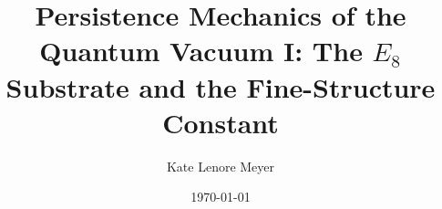 \documentclass[aps,prd,twocolumn,showpacs,superscriptaddress,groupedaddress,nofootinbib,english]{revtex4-2}
\begin{document}
\title{Persistence Mechanics of the Quantum Vacuum I: The \texorpdfstring{$E_8$}{E8} Substrate and the Fine-Structure Constant}

\author{Kate Lenore Meyer}

\date{\today}



\maketitle













\appendix


\end{document}
